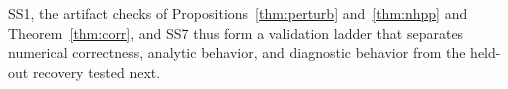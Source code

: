 SS1, the artifact checks of
Propositions~\ref{thm:perturb} and~\ref{thm:nhpp} and
Theorem~\ref{thm:corr}, and SS7 thus form a validation ladder that separates numerical correctness, analytic
behavior, and diagnostic behavior from the held-out recovery tested
next.


